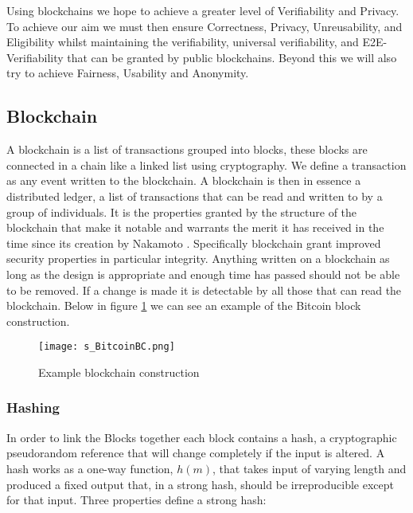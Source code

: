 \documentclass{entcs}
\begin{document}
Using blockchains we hope to achieve a greater level of Verifiability and Privacy. To achieve our aim we must then ensure Correctness, Privacy, Unreusability, and Eligibility whilst maintaining the verifiability, universal verifiability, and E2E-Verifiability that can be granted by public blockchains. Beyond this we will also try to achieve Fairness, Usability and Anonymity.


\subsection{Blockchain}
A blockchain is a list of transactions grouped into blocks, these blocks are connected in a chain like a linked list \cite{blockchainBeginners} using cryptography. We define a transaction as any event written to the blockchain. A blockchain is then in essence a distributed ledger, a list of transactions that can be read and written to by a group of individuals. It is the properties granted by the structure of the blockchain that make it notable and warrants the merit it has received in the time since its creation by Nakamoto \cite{BTCWhitepaper}. Specifically blockchain grant improved security properties in particular integrity. Anything written on a blockchain as long as the design is appropriate and enough time has passed should not be able to be removed. If a change is made it is detectable by all those that can read the blockchain. Below in figure \ref{fig:BlockCon} we can see an example of the Bitcoin block construction.

%
\begin{figure}[h!]
    \centering
    \texttt{[image: s\_BitcoinBC.png]}
    \caption{Example blockchain construction}
    \label{fig:BlockCon}
\end{figure}

\subsubsection{Hashing}
In order to link the Blocks together each block contains a hash, a cryptographic pseudorandom reference that will change completely if the input is altered. A hash works as a one-way function, \(h(m)\), that takes input of varying length and produced a fixed output that, in a strong hash, should be irreproducible except for that input. Three properties \cite{cryptoHandbook} define a strong hash:
\end{document}

